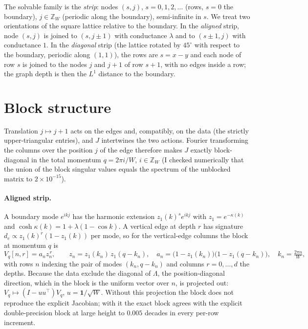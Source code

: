 \documentclass[11pt,a4paper]{article}
\begin{document}
The solvable family is the \emph{strip}: nodes $(s,j)$, $s=0,1,2,\dots$ (rows, $s=0$ the boundary), $j\in\mathbb Z_W$
(periodic along the boundary), semi-infinite in $s$. We treat two orientations of the square lattice relative to the
boundary. In the \emph{aligned} strip, node $(s,j)$ is joined to $(s,j\pm1)$ with conductance $\lambda$ and to $(s\pm1,j)$ with
conductance $1$. In the \emph{diagonal} strip (the lattice rotated by $45^\circ$ with respect to the boundary, periodic along
$(1,1)$), the rows are $s=x-y$ and each node of row $s$ is joined to the nodes $j$ and $j+1$ of row $s+1$, with no edges inside a
row; the graph depth is then the $L^1$ distance to the boundary.

\section{Block structure}
Translation $j\mapsto j+1$ acts on the edges and, compatibly, on the data (the strictly upper-triangular entries), and
$J$ intertwines the two actions. Fourier transforming the columns over the position $j$ of the edge therefore makes $J$ exactly
block-diagonal in the total momentum $q=2\pi i/W$, $i\in\mathbb Z_W$ (I checked numerically that the union of the block
singular values equals the spectrum of the unblocked matrix to $2\times10^{-15}$).

\paragraph{Aligned strip.} A boundary mode $e^{ikj}$ has the harmonic extension $z_1(k)^s e^{ikj}$ with
$z_1=e^{-\kappa(k)}$ and $\cosh\kappa(k)=1+\lambda(1-\cos k)$. A vertical edge at depth $r$ has signature
$d_e\propto z_1(k)^r(1-z_1(k))$ per mode, so for the vertical-edge columns the block at momentum $q$ is
\begin{equation}
V_q[n,r]=a_n z_n^{\,r},\qquad z_n=z_1(k_n)\,z_1(q-k_n),\quad a_n=\bigl(1-z_1(k_n)\bigr)\bigl(1-z_1(q-k_n)\bigr),\quad k_n=\tfrac{2\pi n}{W},
\label{eq:block}
\end{equation}
with rows $n$ indexing the pair of modes $(k_n,q-k_n)$ and columns $r=0,\dots,d$ the depths. Because the data exclude the
diagonal of $\Lambda$, the position-diagonal direction, which in the block is the uniform vector over $n$, is projected out:
$V_q\mapsto(I-uu^{\top})V_q$, $u=\mathbf 1/\sqrt W$. Without this projection the block does not reproduce the explicit
Jacobian; with it the exact block agrees with the explicit double-precision block at large height to $0.005$ decades in every
per-row increment.
\end{document}

